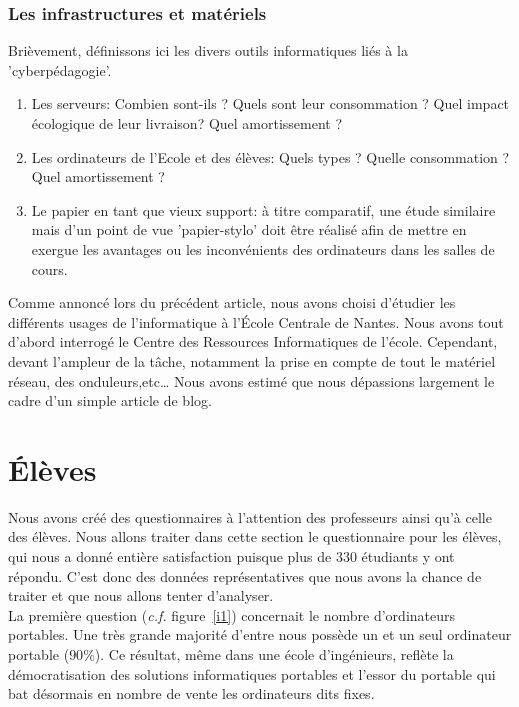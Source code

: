 \documentclass[a4paper,11pt,french]{report}
\begin{document}
\subsubsection{Les infrastructures et matériels}
Brièvement, définissons ici les divers outils informatiques liés à la 'cyberpédagogie'. 
\begin{enumerate}
\item Les serveurs: Combien sont-ils ? Quels sont leur consommation ? Quel impact écologique de leur livraison? Quel amortissement ?
\item Les ordinateurs de l'Ecole et des élèves: Quels types ? Quelle consommation ? Quel amortissement ?
\item Le papier en tant que vieux support: à titre comparatif, une étude similaire mais d'un point de vue 'papier-stylo' doit être réalisé afin de mettre en exergue les avantages ou les inconvénients des ordinateurs dans les salles de cours.
\end{enumerate}


Comme annoncé lors du précédent article, nous avons choisi d’étudier les différents usages de l’informatique à l’École Centrale de Nantes. Nous avons tout d’abord interrogé le Centre des Ressources Informatiques de l’école. Cependant, devant l’ampleur de la tâche, notamment la prise en compte de tout le matériel réseau, des onduleurs,etc… Nous avons estimé que nous dépassions largement le cadre d’un simple article de blog.

\section{\'Elèves}
Nous avons créé des questionnaires à l’attention des professeurs ainsi qu’à celle des élèves. Nous allons traiter dans cette section le questionnaire pour les élèves, qui nous a donné entière satisfaction puisque plus de 330 étudiants y ont répondu. C’est donc des données représentatives que nous avons la chance de traiter et que nous allons tenter d’analyser.\\

La première question (\textit{c.f.} figure~\vref{i1}) concernait le nombre d’ordinateurs portables. Une très grande majorité d’entre nous possède un et un seul ordinateur portable ($90\%$). Ce résultat, même dans une école d’ingénieurs, reflète la démocratisation des solutions informatiques portables et l’essor du portable qui bat désormais en nombre de vente les ordinateurs dits fixes.\\
\end{document}

